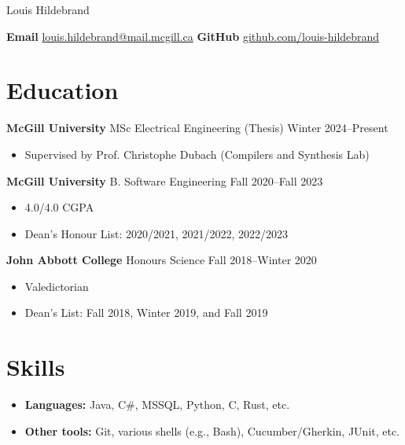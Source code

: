 \documentclass[12pt]{article}
\begin{document}

\pagestyle{empty}

\begin{center}
	\Huge
	Louis Hildebrand
\end{center}
\vspace{0.5\baselineskip}

\textbf{Email}
\href{mailto:louis.hildebrand@mail.mcgill.ca}{louis.hildebrand@mail.mcgill.ca}
\hfill
\textbf{GitHub}
\href{https://github.com/louis-hildebrand}{github.com/louis-hildebrand}

\section*{Education}

\textbf{McGill University} MSc Electrical Engineering (Thesis)
\hfill
Winter 2024--Present
\begin{itemize}
	\item Supervised by Prof. Christophe Dubach (Compilers and Synthesis Lab)
\end{itemize}

\textbf{McGill University} B. Software Engineering
\hfill
Fall 2020--Fall 2023
\begin{itemize}
	\item 4.0/4.0 CGPA
	\item Dean's Honour List: 2020/2021, 2021/2022, 2022/2023
\end{itemize}

\textbf{John Abbott College} Honours Science
\hfill
Fall 2018--Winter 2020
\begin{itemize}
	\item Valedictorian
	\item Dean's List: Fall 2018, Winter 2019, and Fall 2019
\end{itemize}

\section*{Skills}

\begin{itemize}
	\item \textbf{Languages:} Java, C\#, MSSQL, Python, C, Rust, etc.
	\item \textbf{Other tools:} Git, various shells (e.g., Bash), Cucumber/Gherkin, JUnit, etc.
\end{itemize}
\end{document}
